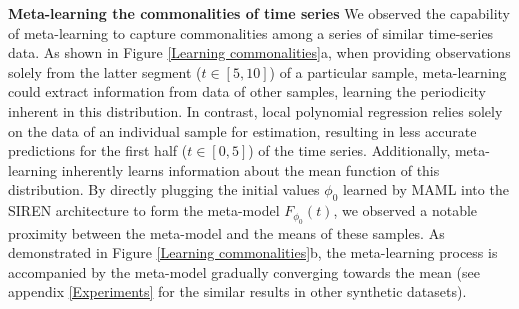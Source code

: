 \documentclass{article}
\begin{document}



\textbf{Meta-learning the commonalities of time series}
We observed the capability of meta-learning to capture commonalities among a series of similar time-series data.
As shown in Figure \ref{Learning commonalities}a, when providing observations solely from the latter segment ($t \in [5, 10]$) of a particular sample, 
meta-learning could extract information from data of other samples, learning the periodicity inherent in this distribution. 
In contrast, local polynomial regression relies solely on the data of an individual sample for estimation, 
resulting in less accurate predictions for the first half ($t \in [0, 5]$) of the time series.
Additionally, meta-learning inherently learns information about the mean function of this distribution. 
By directly plugging the initial values $\phi_0$ learned by MAML into the SIREN architecture to form the meta-model $F_{\phi_0}(t)$,
we observed a notable proximity between the meta-model and the means of these samples. 
As demonstrated in Figure \ref{Learning commonalities}b, the meta-learning process is accompanied by the meta-model gradually converging towards the mean (see appendix \ref{Experiments} for the similar results in other synthetic datasets).
\end{document}
